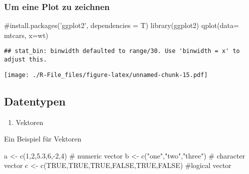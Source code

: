 \documentclass[]{article}
\newenvironment{Shaded}{\begin{snugshade}}{\end{snugshade}}
\newcommand{\KeywordTok}[1]{\textcolor[rgb]{0.94,0.87,0.69}{{#1}}}
\newcommand{\DataTypeTok}[1]{\textcolor[rgb]{0.87,0.87,0.75}{{#1}}}
\newcommand{\DecValTok}[1]{\textcolor[rgb]{0.86,0.86,0.80}{{#1}}}
\newcommand{\FloatTok}[1]{\textcolor[rgb]{0.75,0.75,0.82}{{#1}}}
\newcommand{\StringTok}[1]{\textcolor[rgb]{0.80,0.58,0.58}{{#1}}}
\newcommand{\CommentTok}[1]{\textcolor[rgb]{0.50,0.62,0.50}{{#1}}}
\newcommand{\OtherTok}[1]{\textcolor[rgb]{0.94,0.94,0.56}{{#1}}}
\newcommand{\NormalTok}[1]{\textcolor[rgb]{0.80,0.80,0.80}{{#1}}}
\begin{document}
\subsubsection{Um eine Plot zu zeichnen}\label{um-eine-plot-zu-zeichnen}

\begin{Shaded}
\begin{Highlighting}[]
\CommentTok{#install.packages('ggplot2', dependencies = T)}
\KeywordTok{library}\NormalTok{(ggplot2)}
\KeywordTok{qplot}\NormalTok{(}\DataTypeTok{data=} \NormalTok{mtcars, }\DataTypeTok{x=}\NormalTok{wt)}
\end{Highlighting}
\end{Shaded}

\begin{verbatim}
## stat_bin: binwidth defaulted to range/30. Use 'binwidth = x' to adjust this.
\end{verbatim}

\texttt{[image: ./R-File\_files/figure-latex/unnamed-chunk-15.pdf]}

\subsection{Datentypen}\label{datentypen}

\begin{enumerate}
\def\labelenumi{\arabic{enumi}.}
\itemsep1pt\parskip0pt
\item
  Vektoren
\end{enumerate}

Ein Beispiel für Vektoren

\begin{Shaded}
\begin{Highlighting}[]
\NormalTok{a <-}\StringTok{ }\KeywordTok{c}\NormalTok{(}\DecValTok{1}\NormalTok{,}\DecValTok{2}\NormalTok{,}\FloatTok{5.3}\NormalTok{,}\DecValTok{6}\NormalTok{,-}\DecValTok{2}\NormalTok{,}\DecValTok{4}\NormalTok{) }\CommentTok{# numeric vector}
\NormalTok{b <-}\StringTok{ }\KeywordTok{c}\NormalTok{(}\StringTok{"one"}\NormalTok{,}\StringTok{"two"}\NormalTok{,}\StringTok{"three"}\NormalTok{) }\CommentTok{# character vector}
\NormalTok{c <-}\StringTok{ }\KeywordTok{c}\NormalTok{(}\OtherTok{TRUE}\NormalTok{,}\OtherTok{TRUE}\NormalTok{,}\OtherTok{TRUE}\NormalTok{,}\OtherTok{FALSE}\NormalTok{,}\OtherTok{TRUE}\NormalTok{,}\OtherTok{FALSE}\NormalTok{) }\CommentTok{#logical vector}
\end{Highlighting}
\end{Shaded}
\end{document}
